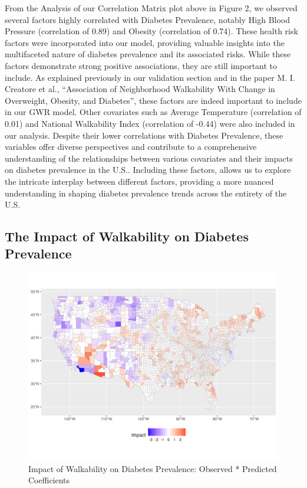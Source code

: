 \documentclass[
]{article}
\begin{document}
From the Analysis of our Correlation Matrix plot above in Figure 2, we
observed several factors highly correlated with Diabetes Prevalence,
notably High Blood Pressure (correlation of 0.89) and Obesity
(correlation of 0.74). These health risk factors were incorporated into
our model, providing valuable insights into the multifaceted nature of
diabetes prevalence and its associated risks. While these factors
demonstrate strong positive associations, they are still important to
include. As explained previously in our validation section and in the
paper M. I. Creatore et al., ``Association of Neighborhood Walkability
With Change in Overweight, Obesity, and Diabetes'', these factors are
indeed important to include in our GWR model. Other covariates such as
Average Temperature (correlation of 0.01) and National Walkability Index
(correlation of -0.44) were also included in our analysis. Despite their
lower correlations with Diabetes Prevalence, these variables offer
diverse perspectives and contribute to a comprehensive understanding of
the relationships between various covariates and their impacts on
diabetes prevalence in the U.S.. Including these factors, allows us to
explore the intricate interplay between different factors, providing a
more nuanced understanding in shaping diabetes prevalence trends across
the entirety of the U.S.

\subsection{The Impact of Walkability on Diabetes
Prevalence}\label{the-impact-of-walkability-on-diabetes-prevalence}

\begin{figure}[H]

{\centering \includegraphics{impact_plot.png}

}

\caption{Impact of Walkability on Diabetes Prevalence: Observed *
Predicted Coefficients}

\end{figure}%
\end{document}
